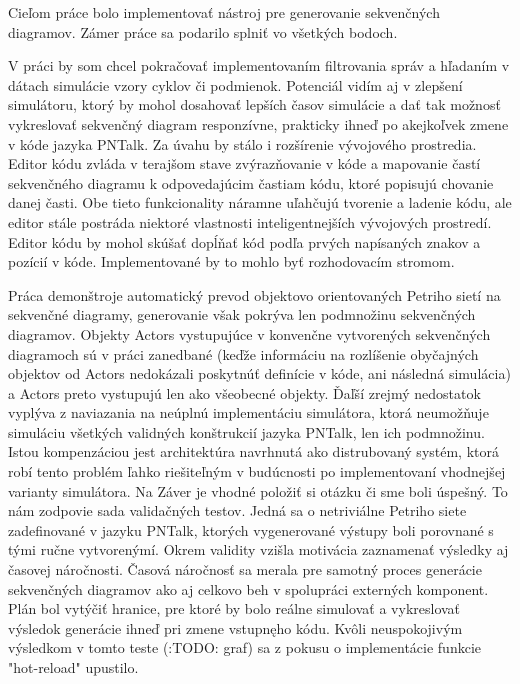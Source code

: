 Cieľom práce bolo implementovať nástroj pre generovanie sekvenčných diagramov. Zámer práce sa podarilo splniť vo všetkých bodoch.

V práci by som chcel pokračovať implementovaním filtrovania správ a hľadaním v dátach simulácie vzory cyklov či podmienok. Potenciál vidím aj v zlepšení simulátoru, ktorý by mohol dosahovať lepších časov simulácie a dať tak možnosť vykreslovať sekvenčný diagram responzívne, prakticky ihneď po akejkoľvek zmene v kóde jazyka PNTalk. Za úvahu by stálo i rozšírenie vývojového prostredia.
Editor kódu zvláda v terajšom stave zvýrazňovanie v kóde a mapovanie častí sekvenčného diagramu k odpovedajúcim častiam kódu, ktoré popisujú chovanie danej časti. Obe tieto funkcionality náramne uľahčujú tvorenie a ladenie kódu, ale editor stále postráda niektoré vlastnosti inteligentnejších vývojových prostredí. Editor kódu by mohol skúšať dopĺňať kód podľa prvých napísaných znakov a pozícií v kóde. Implementované by to mohlo byť rozhodovacím stromom.

Práca demonštroje automatický prevod objektovo orientovaných Petriho sietí na sekvenčné diagramy, generovanie však pokrýva len podmnožinu sekvenčných diagramov. Objekty Actors vystupujúce v konvenčne vytvorených sekvenčných diagramoch sú v práci zanedbané (keďže informáciu na rozlíšenie obyčajných objektov od Actors nedokázali poskytnúť definície v kóde, ani následná simulácia) a Actors preto vystupujú len ako všeobecné objekty. Ďaľší zrejmý nedostatok vyplýva z naviazania na neúplnú implementáciu simulátora, ktorá neumožňuje simuláciu všetkých validných konštrukcií jazyka PNTalk, len ich podmnožinu. Istou kompenzáciou jest architektúra navrhnutá ako distrubovaný systém, ktorá robí tento problém ľahko riešiteľným v budúcnosti po implementovaní vhodnejšej varianty simulátora. Na Záver je vhodné položiť si otázku či sme boli úspešný.
To nám zodpovie sada validačných testov. Jedná sa o netriviálne Petriho siete zadefinované v jazyku PNTalk, ktorých vygenerované výstupy boli porovnané s tými ručne vytvorenýmí. Okrem validity vzišla motivácia zaznamenať výsledky aj časovej náročnosti. Časová náročnosť sa merala pre samotný proces generácie sekvenčných diagramov ako aj celkovo beh v spolupráci externých komponent. Plán bol vytýčiť hranice, pre ktoré by bolo reálne simulovať a vykreslovať výsledok generácie ihneď pri zmene vstupnęho kódu. Kvôli neuspokojivým výsledkom v tomto teste (:TODO: graf) sa z pokusu o implementácie funkcie "hot-reload" upustilo. 





 

